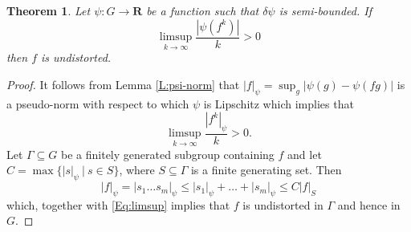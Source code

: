 \documentclass[10pt,a4paper]{amsart}
\newtheorem{theorem}{Theorem}
\newcommand{\B}[1]{{\mathbf #1}}
\begin{document}
\begin{theorem}\label{T:distortion}
Let $\psi \colon G\to \B R$ be a function such that $\delta\psi$ is semi-bounded.
If 
$$
\limsup_{k\to \infty}\frac{|\psi(f^k)|}{k}>0
$$ 
then $f$ is undistorted.
\end{theorem}

\begin{proof}
It follows from Lemma \ref{L:psi-norm} that $|f|_{\psi}=\sup_g|\psi(g)-\psi(fg)|$ 
is a pseudo-norm with respect to which
$\psi$ is Lipschitz which implies that 
\begin{equation}
\limsup_{k\to \infty} \frac{|f^k|_{\psi}}{k}>0.
\label{Eq:limsup}
\end{equation}
Let
$\Gamma\subseteq G$ be a finitely generated subgroup containing $f$
and let $C=\max\{|s|_{\psi}\ |\ s\in S\}$, 
where $S\subseteq \Gamma$ is a finite generating set. Then
$$
|f|_{\psi} = |s_1\dots s_m|_{\psi} \leq |s_1|_{\psi} + \dots + |s_m|_{\psi}
\leq C |f|_S
$$
which, together with \eqref{Eq:limsup} implies that $f$ is undistorted in $\Gamma$
and hence in $G$.
\end{proof}
\end{document}
